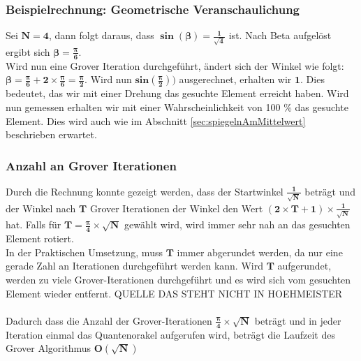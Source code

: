 \subsubsection{Beispielrechnung: Geometrische Veranschaulichung}
Sei $\mathbf{N=4}$, dann folgt daraus, dass $\mathbf{\sin(\beta) = \frac{1}{\sqrt{4}}}$ ist. Nach Beta aufgelöst ergibt sich $\mathbf{\beta = \frac{\pi}{6}}$.
\\
Wird nun eine Grover Iteration durchgeführt, ändert sich der Winkel wie folgt: $\mathbf{\beta = \frac{\pi}{6} + 2 \times \frac{\pi}{6}  = \frac{\pi}{2}}$. Wird nun $\mathbf{sin(\frac{\pi}{2}))}$ ausgerechnet, erhalten wir $\mathbf{1}$. Dies bedeutet, das wir mit einer Drehung das gesuchte Element erreicht haben. Wird nun gemessen erhalten wir mit einer Wahrscheinlichkeit von 100 \% das gesuchte Element. Dies wird auch wie im Abschnitt  \ref{sec:spiegelnAmMittelwert}  beschrieben erwartet.

\subsubsection{Anzahl an Grover Iterationen}
Durch die Rechnung konnte gezeigt werden, dass der Startwinkel $\mathbf{\frac{1}{\sqrt{N}}}$ beträgt und der Winkel nach $\mathbf{T}$ Grover Iterationen der Winkel den Wert $\mathbf{(2 \times T + 1)\times \frac{1}{\sqrt{N}}}$ hat. 
Falls für $\mathbf{T = \frac{\pi}{4}\times \sqrt{N}}$ gewählt wird, wird immer sehr nah an das gesuchten Element rotiert. 
\\
In der Praktischen Umsetzung, muss $\mathbf{T}$ immer abgerundet werden, da nur eine gerade Zahl an Iterationen durchgeführt werden kann. Wird $\mathbf{T}$ aufgerundet, werden zu viele Grover-Iterationen durchgeführt und es wird sich vom gesuchten Element wieder entfernt. QUELLE DAS STEHT NICHT IN HOEHMEISTER
\\
\\
Dadurch dass die Anzahl der Grover-Iterationen $\mathbf{ \frac{\pi}{4}\times \sqrt{N}}$ beträgt und in jeder Iteration einmal das Quantenorakel aufgerufen wird, beträgt die Laufzeit des Grover Algorithmus $\mathbf{O(\sqrt N)}$

